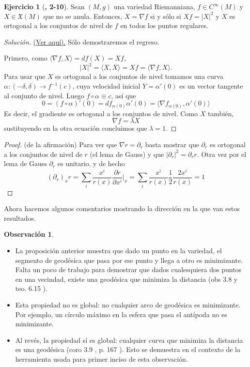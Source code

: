 \documentclass[spanish]{book}
\theoremstyle{definition}
\newtheorem*{obs}{Observación}
\newtheorem*{ejer*}{Ejercicio}
\newcommand{\X}{\mathfrak{X}}
\newcommand{\Cinf}{C^\infty}
\begin{document}
	\begin{ejer*}[\cite{Lee-riem}\textbf{, 2-10}]
		Sean $(M,g)$ una variedad Riemanniana, $f\in\Cinf(M)$ y $X\in\X(M)$ que no se anula. Entonces, $X=\nabla f$ si y sólo si $Xf=|X|^2$ y $X$ es ortogonal a los conjuntos de nivel de $f$ en todos los puntos regulares.
	\end{ejer*}
	\begin{proof}[Solución]
		\href{https://math.stackexchange.com/questions/4630513/vector-field-that-is-the-gradient-of-a-function-on-riemannian-manifold}{(Ver aquí).} Sólo demostraremos el regreso.
		
		Primero, como $\langle \nabla f, X\rangle=df(X)=Xf$,
		\[|X|^2=\langle X,X\rangle=Xf=\langle\nabla f,X\rangle.\]
		Para usar que $X$ es ortogonal a los conjuntos de nivel tomamos una curva $\alpha:(-\delta,\delta)\to f^{-1}(c)$, cuya velocidad inicial $Y=\alpha'(0)$ es un vector tangente al conjunto de nivel. Luego $f\circ\alpha\equiv c$, así que 
		\[0=(f\circ\alpha)'(0)=df_{\alpha(0)}\alpha'(0)=\langle\nabla f_{\alpha(0)}, \alpha'(0)\rangle\]
		Es decir, el gradiente es ortogonal a los conjuntos de nivel. Como $X$ también,
		\[\nabla f=\lambda X\]
		sustituyendo en la otra ecuación concluimos que $\lambda=1$.
		
	\end{proof}
	
	\begin{proof}
		(de la afirmación) Para ver que $\nabla r=\partial_r$ basta mostrar que $\partial_r$ es ortogonal a los conjuntos de nivel de $r$ (el lema de Gauss) y que $|\partial_r|^2=\partial_rr$. Otra vez por el lema de Gauss $\partial_r$ es unitario, y de hecho
		\[(\partial_r)_xr=\sum_i\frac{x^i}{r(x)}\frac{\partial r}{\partial x^i}\Big|_x=\sum_i\frac{x^i}{r(x)}\frac{1}{2}\frac{2x^i}{r(x)}=1\]
	\end{proof}
	
	Ahora hacemos algunos comentarios mostrando la dirección en la que van estos resultados.
	
	\begin{obs}\leavevmode
		\begin{itemize}
			\item La proposición anterior muestra que dado un punto en la variedad, el segmento de geodésica que pasa por ese punto y llega a otro es minimizante. Falta un poco de trabajo para demostrar que dados cualesquiera dos puntos en una vecindad, existe una geodésica que minimiza la distancia (obs 3.8 \cite{DoCarmo} y teo. 6.15 \cite{Lee-riem}).
			
			\item Esta propiedad no es global: no cualquier arco de geodésica es minimizante. Por ejemplo, un círculo máximo en la esfera que pasa el antípoda no es minimizante.
			
			\item Al revés, la propiedad sí es global: cualquier curva que minimiza la distancia es una geodésica (coro 3.9 \cite{DoCarmo}, p. 167 \cite{Lee-riem}). Esto se demuestra en el contexto de la herramienta usada para primer inciso de esta observación.
		\end{itemize}
	\end{obs}
	
\end{document}
